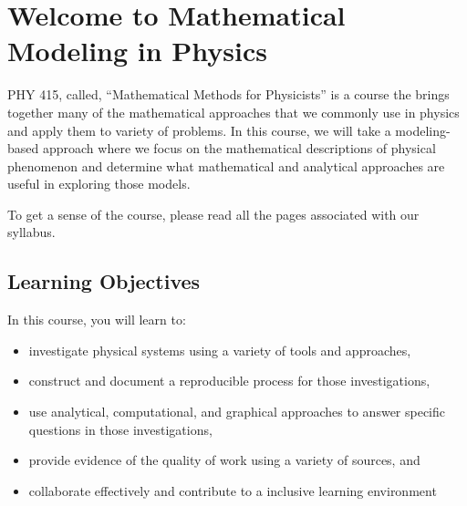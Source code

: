 \section{Welcome to Mathematical Modeling in
Physics}\label{welcome-to-mathematical-modeling-in-physics}

PHY 415, called, ``Mathematical Methods for Physicists'' is a course the
brings together many of the mathematical approaches that we commonly use
in physics and apply them to variety of problems. In this course, we
will take a modeling-based approach where we focus on the mathematical
descriptions of physical phenomenon and determine what mathematical and
analytical approaches are useful in exploring those models.

To get a sense of the course, please read all the pages associated with
our syllabus.

\subsection{Learning Objectives}\label{learning-objectives}

In this course, you will learn to:

\begin{itemize}
\tightlist
\item
  investigate physical systems using a variety of tools and approaches,
\item
  construct and document a reproducible process for those
  investigations,
\item
  use analytical, computational, and graphical approaches to answer
  specific questions in those investigations,
\item
  provide evidence of the quality of work using a variety of sources,
  and
\item
  collaborate effectively and contribute to a inclusive learning
  environment
\end{itemize}
